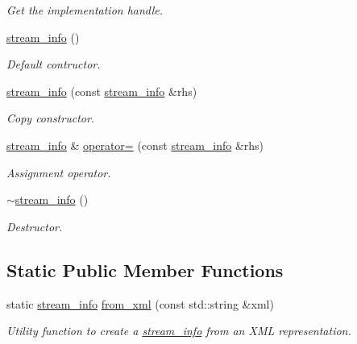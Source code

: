 \begin{DoxyCompactItemize}
\begin{DoxyCompactList}\small\item\em Get the implementation handle. \end{DoxyCompactList}\item 
\hyperlink{classlsl_1_1stream__info_a780a9289cc6f1d57215ed297aecfc78b}{stream\+\_\+info} ()
\begin{DoxyCompactList}\small\item\em Default contructor. \end{DoxyCompactList}\item 
\hyperlink{classlsl_1_1stream__info_a82fd071574212a20ba4faffac5ce7803}{stream\+\_\+info} (const \hyperlink{classlsl_1_1stream__info}{stream\+\_\+info} \&rhs)
\begin{DoxyCompactList}\small\item\em Copy constructor. \end{DoxyCompactList}\item 
\hyperlink{classlsl_1_1stream__info}{stream\+\_\+info} \& \hyperlink{classlsl_1_1stream__info_a8ce8011b9da9b90c8e11e5c1c477a0a2}{operator=} (const \hyperlink{classlsl_1_1stream__info}{stream\+\_\+info} \&rhs)
\begin{DoxyCompactList}\small\item\em Assignment operator. \end{DoxyCompactList}\item 
\hyperlink{classlsl_1_1stream__info_afe4bf312984faef204ee4480385a9bc1}{$\sim$stream\+\_\+info} ()
\begin{DoxyCompactList}\small\item\em Destructor. \end{DoxyCompactList}\end{DoxyCompactItemize}
\subsection*{Static Public Member Functions}
\begin{DoxyCompactItemize}
\item 
static \hyperlink{classlsl_1_1stream__info}{stream\+\_\+info} \hyperlink{classlsl_1_1stream__info_abf8fb6ba88d2f6c4069961149f18faec}{from\+\_\+xml} (const std\+::string \&xml)
\begin{DoxyCompactList}\small\item\em Utility function to create a \hyperlink{classlsl_1_1stream__info}{stream\+\_\+info} from an X\+ML representation. \end{DoxyCompactList}\end{DoxyCompactItemize}


